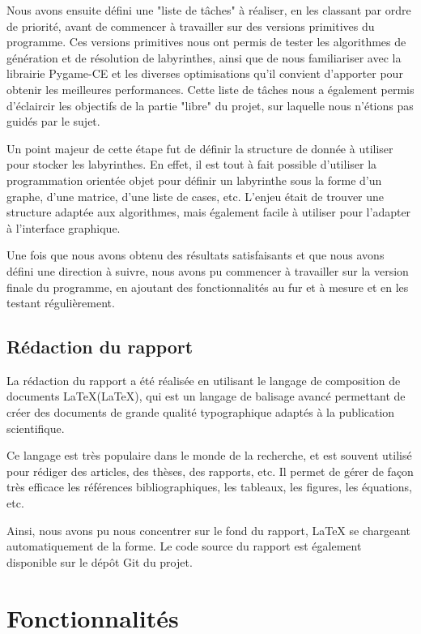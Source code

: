 \documentclass[12pt]{scrreprt} %
\begin{document}
Nous avons ensuite défini une "liste de tâches" à réaliser, en les classant par ordre de priorité, avant de commencer à travailler sur des versions primitives du programme. Ces versions primitives nous ont permis de tester les algorithmes de génération et de résolution de labyrinthes, ainsi que de nous familiariser avec la librairie Pygame-CE et les diverses optimisations qu'il convient d'apporter pour obtenir les meilleures performances. Cette liste de tâches nous a également permis d'éclaircir les objectifs de la partie "libre" du projet, sur laquelle nous n'étions pas guidés par le sujet.

Un point majeur de cette étape fut de définir la structure de donnée à utiliser pour stocker les labyrinthes. En effet, il est tout à fait possible d'utiliser la programmation orientée objet pour définir un labyrinthe sous la forme d'un graphe, d'une matrice, d'une liste de cases, etc. L'enjeu était de trouver une structure adaptée aux algorithmes, mais également facile à utiliser pour l'adapter à l'interface graphique.

Une fois que nous avons obtenu des résultats satisfaisants et que nous avons défini une direction à suivre, nous avons pu commencer à travailler sur la version finale du programme, en ajoutant des fonctionnalités au fur et à mesure et en les testant régulièrement.

\section{Rédaction du rapport}

La rédaction du rapport a été réalisée en utilisant le langage de composition de documents \LaTeX (LaTeX), qui est un langage de balisage  avancé permettant de créer des documents de grande qualité typographique adaptés à la publication scientifique.

Ce langage est très populaire dans le monde de la recherche, et est souvent utilisé pour rédiger des articles, des thèses, des rapports, etc. Il permet de gérer de façon très efficace les références bibliographiques, les tableaux, les figures, les équations, etc.

Ainsi, nous avons pu nous concentrer sur le fond du rapport, LaTeX se chargeant automatiquement de la forme. Le code source du rapport est également disponible sur le dépôt Git du projet.

\chapter{Fonctionnalités}
\end{document}
